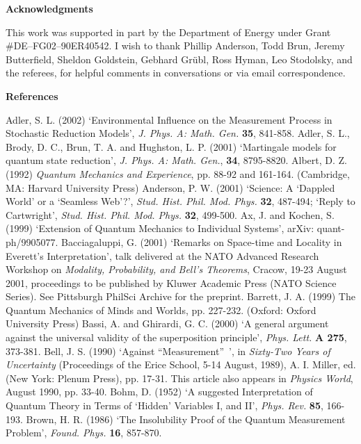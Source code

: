 \bigskip\bigskip
\vfill\eject
\bigskip
\centerline{\bf Acknowledgments}
This work was supported in part by the Department of Energy under
Grant \#DE--FG02--90ER40542.   I wish to thank Phillip Anderson, 
Todd Brun,  Jeremy Butterfield, Sheldon Goldstein, Gebhard Gr\"ubl, 
Ross Hyman, Leo Stodolsky, and the referees, for helpful comments in 
conversations or via email correspondence.     
\vfill\eject
\centerline{\bf References}
\bigskip
\noindent
Adler, S. L. (2002)  `Environmental Influence on the Measurement Process 
in Stochastic Reduction Models', {\it J. Phys. A: Math. Gen.} {\bf 35}, 
841-858.  
\bigskip 
\noindent
Adler, S. L., Brody, D. C., Brun, T. A. and Hughston, L. P. (2001) 
`Martingale models for quantum state reduction', 
{\it J. Phys. A: Math. Gen.}, 
{\bf 34}, 8795-8820. 
\bigskip
\noindent
Albert, D. Z. (1992) {\it Quantum Mechanics and Experience}, pp. 88-92 and  
161-164. (Cambridge, MA: Harvard University Press)
\bigskip
\noindent
Anderson, P. W. (2001)  `Science: A `Dappled World' or a `Seamless Web'?',
{\it Stud. Hist. Phil. Mod. Phys.} {\bf 32}, 487-494; `Reply to Cartwright', 
{\it Stud. Hist. Phil. Mod. Phys.} {\bf 32}, 499-500. 
\bigskip
\noindent
Ax, J. and Kochen, S. (1999) `Extension of Quantum Mechanics to 
Individual Systems', arXiv: quant-ph/9905077. 
\bigskip
\noindent
Bacciagaluppi, G. (2001) `Remarks on Space-time and Locality in Everett's 
Interpretation', talk delivered at the NATO Advanced Research Workshop on 
{\it Modality, Probability, and Bell's Theorems}, Cracow, 19-23 August 2001, 
proceedings to be published by Kluwer Academic Press (NATO Science Series). 
See Pittsburgh PhilSci Archive for the preprint.  
\bigskip
\noindent
Barrett, J. A. (1999)  {The Quantum Mechanics of Minds and Worlds}, 
pp. 227-232.  (Oxford: Oxford University Press)
\bigskip 
\noindent
Bassi, A. and Ghirardi, G. C. (2000) `A general argument against the 
universal validity of the superposition principle', {\it Phys. Lett.} 
{\bf A 275}, 373-381.  
\bigskip
\noindent
Bell, J. S. (1990) `Against ``Measurement''~', in {\it Sixty-Two Years 
of Uncertainty}  (Proceedings of the Erice School, 5-14 August, 1989), 
A. I. Miller, ed. (New York: Plenum Press), pp. 17-31.  This article also  
appears in {\it Physics World}, August 1990, pp. 33-40.  
\bigskip
\noindent
Bohm, D. (1952)  `A suggested Interpretation of Quantum Theory in 
Terms of `Hidden' Variables I, and II', {\it Phys. Rev.} {\bf 85}, 166-193.
\bigskip
\noindent
Brown, H. R. (1986) `The Insolubility Proof of the Quantum Measurement 
Problem', {\it Found. Phys.} {\bf 16}, 857-870. 
